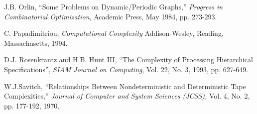 \begin{thebibliography}{HMRR93}
\iffalse
\bibitem[Or82b]{Or82b} J.B. Orlin,
``Minimizing the Number of Vehicles to Meet a Fixed Periodic Schedule:
An Application to Periodic Posets,''
{\em Operations Research,}
No. 30, 1982, pp. 760-776.




\bibitem[Or83a]{Or83a} J.B. Orlin,
``Dynamic Matching and Quasidynamic Fractional Matchings I,''
{\em Networks}
Vol. 13,  1983, pp. 551-562.


\bibitem[Or83b]{Or83b} J.B. Orlin,
``Dynamic Matching and Quasidynamic Fractional Matchings II,''
{\em Networks}
Vol. 13,  1983, pp. 563-580.


\bibitem[Or84a]{Or84a} J.B. Orlin,
``Maximum Convex Cost  Dynamic Network Flows,''
{\em Mathematics for Operations Research,}
Vol. 9, No. 2, May 1984, pp. 190-206.
\fi

 J.B. Orlin,
``Some Problems on Dynamic/Periodic Graphs,''
{\em Progress in Combinatorial Optimization},
Academic Press, May 1984, pp. 273-293.



\iffalse******
\bibitem[PY91]{PY91} C. Papadimitriou and M. Yannakakis,
``Optimization, Approximation and Complexity Classes,''
{\em Journal of Computer and System Sciences (JCSS)}, 
No. 43, 1991, pp. 425-440.
************
\fi


C. Papadimitriou,
{\em Computational Complexity}
Addison-Wesley, Reading, Massachusetts, 1994.




\iffalse
\bibitem[Ra93]{rven} V. Radhakrishnan,
{\em Sequential and Parallel Algorithms for Treewidth Bounded, Planar
and Hierarchically Specified Combinatorial Problems},
 Ph.D. thesis, Department of Computer Science, 
University at Albany,  Albany, NY August, 1993.
\fi


	
 D.J. Rosenkrantz and H.B. Hunt III,
``The Complexity of Processing Hierarchical Specifications'',
{\em SIAM Journal on Computing}, 
Vol. 22, No. 3, 1993, pp. 627-649.





W.J.Savitch, 
``Relationships Between Nondeterministic and Deterministic 
Tape Complexities,'' {\em Journal of Computer and System Sciences (JCSS),} 
Vol. 4, No. 2, pp. 177-192, 1970.



\end{thebibliography}
